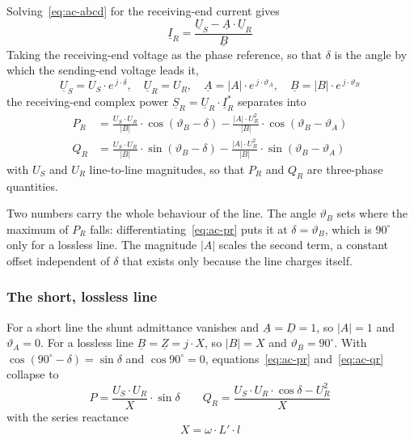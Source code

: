 Solving~\eqref{eq:ac-abcd} for the receiving-end current gives
\begin{equation}
  \underline{I}_R
    = \frac{\underline{U}_S - \underline{A} \cdot \underline{U}_R}
           {\underline{B}}
  \label{eq:ac-ir}
\end{equation}
Taking the receiving-end voltage as the phase reference, so that $\delta$ is
the angle by which the sending-end voltage leads it,
\begin{equation}
  \underline{U}_S = U_S \cdot e^{\,j \cdot \delta},
  \quad
  \underline{U}_R = U_R,
  \quad
  \underline{A} = \left|A\right| \cdot e^{\,j \cdot \vartheta_A},
  \quad
  \underline{B} = \left|B\right| \cdot e^{\,j \cdot \vartheta_B}
  \label{eq:ac-reference}
\end{equation}
the receiving-end complex power $\underline{S}_R = \underline{U}_R \cdot
\underline{I}_R^{*}$ separates into
\begin{align}
  P_R &= \frac{U_S \cdot U_R}{\left|B\right|}
         \cdot \cos\left(\vartheta_B - \delta\right)
       - \frac{\left|A\right| \cdot U_R^2}{\left|B\right|}
         \cdot \cos\left(\vartheta_B - \vartheta_A\right)
  \label{eq:ac-pr} \\[0.3em]
  Q_R &= \frac{U_S \cdot U_R}{\left|B\right|}
         \cdot \sin\left(\vartheta_B - \delta\right)
       - \frac{\left|A\right| \cdot U_R^2}{\left|B\right|}
         \cdot \sin\left(\vartheta_B - \vartheta_A\right)
  \label{eq:ac-qr}
\end{align}
with $U_S$ and $U_R$ line-to-line magnitudes, so that $P_R$ and $Q_R$ are
three-phase quantities.

Two numbers carry the whole behaviour of the line. The angle $\vartheta_B$
sets where the maximum of $P_R$ falls: differentiating~\eqref{eq:ac-pr} puts
it at $\delta = \vartheta_B$, which is $90^\circ$ only for a lossless line.
The magnitude $\left|A\right|$ scales the second term, a constant offset
independent of $\delta$ that exists only because the line charges itself.

\subsubsection{The short, lossless line}
\label{sec:ac-simplified}

For a short line the shunt admittance vanishes and $\underline{A} =
\underline{D} = 1$, so $\left|A\right| = 1$ and $\vartheta_A = 0$. For a
lossless line $\underline{B} = \underline{Z} = j \cdot X$, so
$\left|B\right| = X$ and $\vartheta_B = 90^\circ$. With
$\cos\left(90^\circ - \delta\right) = \sin\delta$ and $\cos 90^\circ = 0$,
equations~\eqref{eq:ac-pr} and~\eqref{eq:ac-qr} collapse to
\begin{equation}
  P = \frac{U_S \cdot U_R}{X} \cdot \sin\delta
  \qquad
  Q_R = \frac{U_S \cdot U_R \cdot \cos\delta - U_R^2}{X}
  \label{eq:ac-simple}
\end{equation}
with the series reactance
\begin{equation}
  X = \omega \cdot L' \cdot l
  \label{eq:ac-x}
\end{equation}

